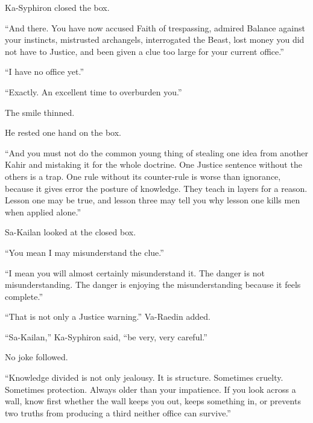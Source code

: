 

Ka-Syphiron closed the box.\par

“And there.
You have now accused Faith of trespassing, admired Balance against your instincts, mistrusted archangels, interrogated the Beast, lost money you did not have to Justice, 
and been given a clue too large for your current office.”\par

“I have no office yet.”\par

“Exactly.
An excellent time to overburden you.”\par

The smile thinned.\par

He rested one hand on the box.\par

“And you must not do the common young thing of stealing one idea from another Kahir and mistaking it for the whole doctrine.
One Justice sentence without the others is a trap.
One rule without its counter-rule is worse than ignorance, because it gives error the posture of knowledge.
They teach in layers for a reason.
Lesson one may be true, and lesson three may tell you why lesson one kills men when applied alone.”\par

Sa-Kailan looked at the closed box.\par

“You mean I may misunderstand the clue.”\par

“I mean you will almost certainly misunderstand it.
The danger is not misunderstanding.
The danger is enjoying the misunderstanding because it feels complete.”\par

“That is not only a Justice warning.” Va-Raedin added. \par

“Sa-Kailan,” Ka-Syphiron said, “be very, very careful.”\par

No joke followed.\par

“Knowledge divided is not only jealousy.
It is structure.
Sometimes cruelty.
Sometimes protection.
Always older than your impatience.
If you look across a wall, know first whether the wall keeps you out, keeps something in, or prevents two truths from producing a third neither office can survive.”\par

